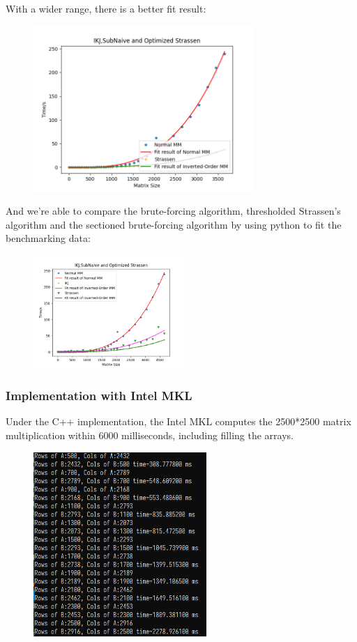 \documentclass[UTF8]{ctexart}
\begin{document}
With a wider range, there is a better fit result:
\begin{figure}[htb]
  \begin{center}
    \includegraphics[height=6.3cm]{../ppt/slide-UIBK/ikj_naive_comp.png}
  \end{center}
\end{figure}
And we're able to compare the brute-forcing algorithm, thresholded Strassen's algorithm and the sectioned brute-forcing algorithm by using python to fit the benchmarking data:
\begin{figure}[htb]
  \begin{center}
    \includegraphics[height=4.3cm]{../ppt/slide-UIBK/ikj_naive_strassen_comp.png}
  \end{center}
\end{figure}
\subsubsection{Implementation with Intel MKL}
\label{subsubsec::IwIMKL}

Under the C++ implementation, the Intel MKL computes the 2500*2500
matrix multiplication within 6000 milliseconds, including filling the
arrays.

\begin{figure}[htb]
  \centering
  \includegraphics[height=7.0cm]{../ppt/slide-UIBK/mkl_dgemm.png}
  \caption{}
\end{figure}
\end{document}
